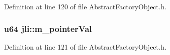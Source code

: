 Definition at line 120 of file Abstract\+Factory\+Object.\+h.

\hypertarget{namespacejli_a33c35463a7c7fe6bdede0f192fe9d7c6}{
\subsubsection[{m\+\_\+pointer\+Val}]{\setlength{\rightskip}{0pt plus 5cm}u64 jli\+::m\+\_\+pointer\+Val}}\label{namespacejli_a33c35463a7c7fe6bdede0f192fe9d7c6}


Definition at line 121 of file Abstract\+Factory\+Object.\+h.

